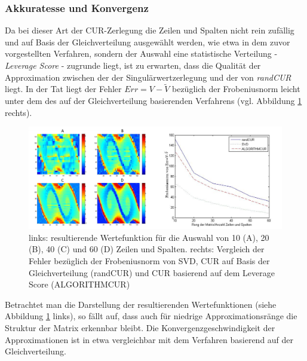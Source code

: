\documentclass[12pt,a4paper,twoside]{article}
\begin{document}
	\subsubsection*{Akkuratesse und Konvergenz}
	Da bei dieser Art der CUR-Zerlegung die Zeilen und Spalten nicht rein zufällig und auf Basis der Gleichverteilung ausgewählt werden, wie etwa in dem zuvor vorgestellten Verfahren, sondern der Auswahl eine statistische Verteilung - \textit{Leverage Score} - zugrunde liegt, ist zu erwarten, dass die Qualität der Approximation zwischen der der Singulärwertzerlegung und der von \textit{randCUR} liegt. In der Tat liegt der Fehler $Err=V-\tilde{V}$ bezüglich der Frobeniusnorm leicht unter dem des auf der Gleichverteilung basierenden Verfahrens (vgl. Abbildung \ref{CURortho_vf} rechts).
	\begin{figure}[h]
		\center
		\includegraphics[scale=0.5]{CUR_plots_vf}
		\caption{\label{CURortho_vf}links: resultierende Wertefunktion für die Auswahl von 10 (A), 20 (B), 40 (C) und 60 (D) Zeilen und Spalten. rechts: Vergleich der Fehler bezüglich der Frobeniusnorm von SVD, CUR auf Basis der Gleichverteilung (randCUR) und CUR basierend auf dem Leverage Score (ALGORITHMCUR)}
	\end{figure}
	Betrachtet man die Darstellung der resultierenden Wertefunktionen (siehe Abbildung \ref{CURortho_vf} links), so fällt auf, dass auch für niedrige Approximationsränge die Struktur der Matrix erkennbar bleibt. Die Konvergenzgeschwindigkeit der Approximationen ist in etwa vergleichbar mit dem Verfahren basierend auf der Gleichverteilung.
	\newpage
\end{document}
